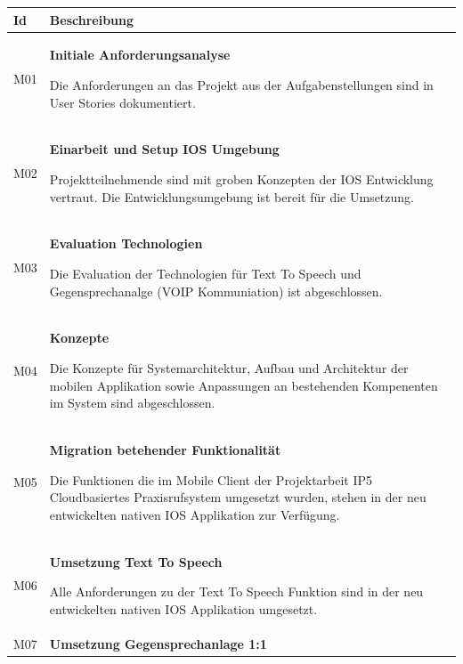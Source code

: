 \begin{table}[h]
    \centering
    \begin{tabular}{|l|p{15cm}|}
        \hline
        \textbf{Id} & \textbf{Beschreibung}                                                                                                                                                                                         \\
        \hline

        M01         & \textbf{Initiale Anforderungsanalyse}

        Die Anforderungen an das Projekt aus der Aufgabenstellungen sind in User Stories dokumentiert.\\
        \hline

        M02         & \textbf{Einarbeit und Setup IOS Umgebung}

        Projektteilnehmende sind mit groben Konzepten der IOS Entwicklung vertraut.
        Die Entwicklungsumgebung ist bereit für die Umsetzung. \\
        \hline

        M03         & \textbf{Evaluation Technologien}

        Die Evaluation der Technologien für Text To Speech und Gegensprechanalge (VOIP Kommuniation) ist abgeschlossen. \\
        \hline

        M04         & \textbf{Konzepte}

        Die Konzepte für Systemarchitektur, Aufbau und Architektur der mobilen Applikation sowie Anpassungen
        an bestehenden Kompenenten im System sind abgeschlossen. \\
        \hline

        M05         & \textbf{Migration betehender Funktionalität}

        Die Funktionen die im Mobile Client der Projektarbeit IP5 Cloudbasiertes Praxisrufsystem umgesetzt wurden,
        stehen in der neu entwickelten nativen IOS Applikation zur Verfügung. \\
        \hline

        M06         & \textbf{Umsetzung Text To Speech}

        Alle Anforderungen zu der Text To Speech Funktion sind in der neu entwickelten nativen IOS Applikation umgesetzt. \\
        \hline

        M07         & \textbf{Umsetzung Gegensprechanlage 1:1}


\end{tabular}
\end{table}
